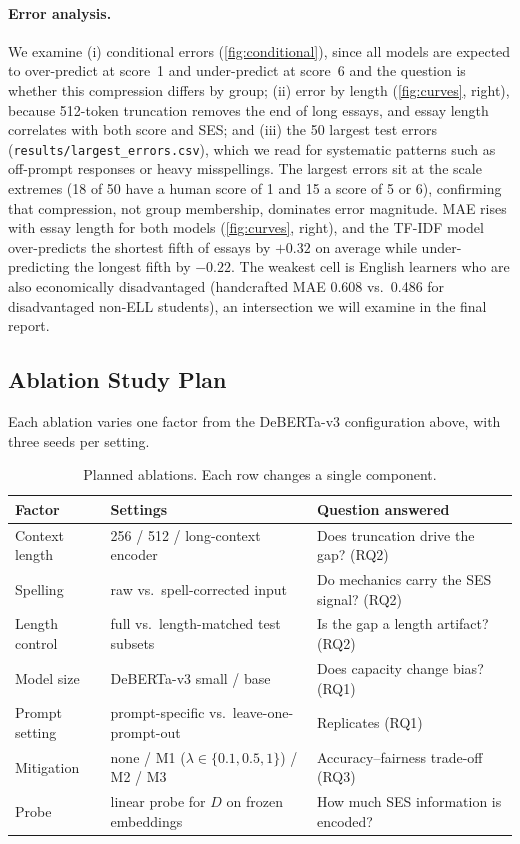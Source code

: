 \documentclass{article}
\begin{document}
\paragraph{Error analysis.} We examine (i) conditional errors (\cref{fig:conditional}), since all models are expected to over-predict at score~1 and under-predict at score~6 and the question is whether this compression differs by group; (ii) error by length (\cref{fig:curves}, right), because 512-token truncation removes the end of long essays, and essay length correlates with both score and SES; and (iii) the 50 largest test errors (\texttt{results/largest\_errors.csv}), which we read for systematic patterns such as off-prompt responses or heavy misspellings. The largest errors sit at the scale extremes (18 of 50 have a human score of 1 and 15 a score of 5 or 6), confirming that compression, not group membership, dominates error magnitude. MAE rises with essay length for both models (\cref{fig:curves}, right), and the TF-IDF model over-predicts the shortest fifth of essays by $+0.32$ on average while under-predicting the longest fifth by $-0.22$. The weakest cell is English learners who are also economically disadvantaged (handcrafted MAE 0.608 vs.\ 0.486 for disadvantaged non-ELL students), an intersection we will examine in the final report.

\subsection{Ablation Study Plan}
\label{sec:ablation}

Each ablation varies one factor from the DeBERTa-v3 configuration above, with three seeds per setting.

\begin{table}[h]
  \centering
  \caption{Planned ablations. Each row changes a single component.}
  \label{tab:ablations}
  \small
  \begin{tabularx}{\linewidth}{l X X}
    \toprule
    Factor & Settings & Question answered \\
    \midrule
    Context length & 256 / 512 / long-context encoder & Does truncation drive the gap? (RQ2) \\
    Spelling & raw vs.\ spell-corrected input & Do mechanics carry the SES signal? (RQ2) \\
    Length control & full vs.\ length-matched test subsets & Is the gap a length artifact? (RQ2) \\
    Model size & DeBERTa-v3 small / base & Does capacity change bias? (RQ1) \\
    Prompt setting & prompt-specific vs.\ leave-one-prompt-out & Replicates \citet{yang2024tapestry} (RQ1) \\
    Mitigation & none / M1 ($\lambda \in \{0.1, 0.5, 1\}$) / M2 / M3 & Accuracy--fairness trade-off (RQ3) \\
    Probe & linear probe for $D$ on frozen embeddings & How much SES information is encoded? \\
    \bottomrule
  \end{tabularx}
\end{table}
\end{document}
